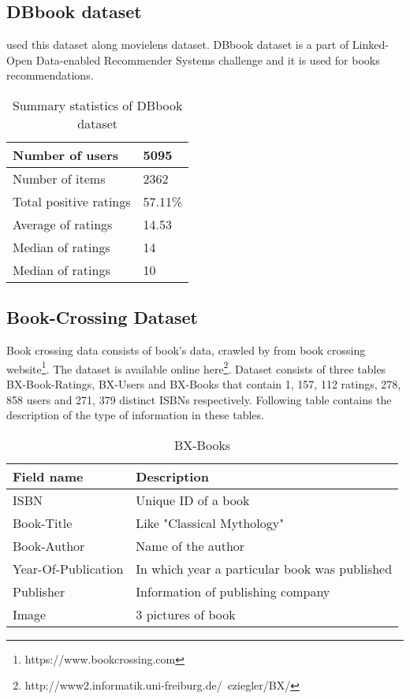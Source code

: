 \subsection{DBbook dataset}
\cite{N28} used this dataset along movielens dataset. DBbook dataset is a part of Linked-Open Data-enabled Recommender Systems challenge and it is used for books recommendations.

\begin{table}[!htbp] 
\centering
\footnotesize
\def\arraystretch{1.4}%
\centering
\begin{tabular}{|p{8cm}|p{2cm}|}
\hline
Number of users& 5095
\\
\hline
Number of items & 2362
\\
\hline 
Total positive ratings & 57.11\%
\\
\hline 
Average of ratings & 14.53
\\
\hline 
Median of ratings & 14
\\
\hline 
Median of ratings & 10
\\
\hline
\end{tabular}

\caption{Summary statistics of DBbook dataset}
\label{table:6}
\end{table}
\subsection{Book-Crossing Dataset}
Book crossing data consists of book's data, crawled by\cite{bookcrossing} from book crossing website\footnote{https://www.bookcrossing.com}. The dataset is available online here\footnote{http://www2.informatik.uni-freiburg.de/~cziegler/BX/}. 
Dataset consists of three tables BX-Book-Ratings, BX-Users and BX-Books that contain 1, 157, 112 ratings, 278, 858 users and 271, 379 distinct ISBNs respectively. Following table contains the description of the type of information in these tables.
\\
\begin{table}[!htbp] 
\centering
\footnotesize
\def\arraystretch{1.4}%
\centering
\begin{tabular}{|p{2cm}|p{8cm}|}
\hline
Field name  & Description
\\
\hline
ISBN & Unique ID of a book
\\
\hline 
Book-Title & Like "Classical Mythology"
\\
\hline 
Book-Author & Name of the author
\\
\hline 
Year-Of-Publication & In which year a particular book was published
\\
\hline
Publisher & Information of publishing company
\\
\hline
Image & 3 pictures of book
\\
\hline
\end{tabular}

\caption{BX-Books}
\label{table:7}
\end{table}


